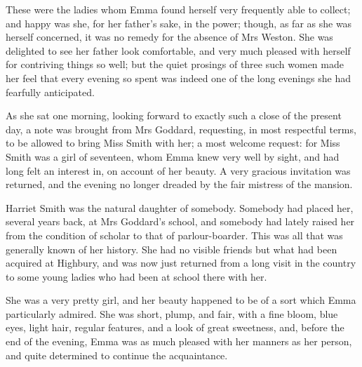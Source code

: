 These were the ladies whom Emma found herself very frequently able to collect; and happy was she, for her father's sake, in the power; though, as far as she was herself concerned, it was no remedy for the absence of Mrs Weston. She was delighted to see her father look comfortable, and very much pleased with herself for contriving things so well; but the quiet prosings of three such women made her feel that every evening so spent was indeed one of the long evenings she had fearfully anticipated.

As she sat one morning, looking forward to exactly such a close of the present day, a note was brought from Mrs Goddard, requesting, in most respectful terms, to be allowed to bring Miss Smith with her; a most welcome request: for Miss Smith was a girl of seventeen, whom Emma knew very well by sight, and had long felt an interest in, on account of her beauty. A very gracious invitation was returned, and the evening no longer dreaded by the fair mistress of the mansion.

Harriet Smith was the natural daughter of somebody. Somebody had placed her, several years back, at Mrs Goddard's school, and somebody had lately raised her from the condition of scholar to that of parlour-boarder. This was all that was generally known of her history. She had no visible friends but what had been acquired at Highbury, and was now just returned from a long visit in the country to some young ladies who had been at school there with her.

She was a very pretty girl, and her beauty happened to be of a sort which Emma particularly admired. She was short, plump, and fair, with a fine bloom, blue eyes, light hair, regular features, and a look of great sweetness, and, before the end of the evening, Emma was as much pleased with her manners as her person, and quite determined to continue the acquaintance.

